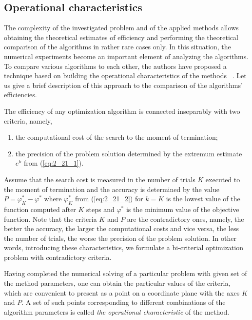 \subsection {Operational characteristics}
\label{subsec:2_2_3}
The complexity of the investigated problem and of the applied methods allows obtaining the theoretical estimates of efficiency and performing the theoretical comparison of the algorithms in rather rare cases only. In this situation, the numerical experiments become an important element of analyzing the algorithms. To compare various algorithms to each other, the authors have proposed a technique based on building the operational characteristics of the methods ~\cite{2_GrishaginOperChar, 2_StrSergMon2000}. Let us give a brief description of this approach to the comparison of the algorithms’ efficiencies.

The efficiency of any optimization algorithm is connected inseparably with two criteria, namely,

\begin{enumerate}
\item {the computational cost of the search to the moment of termination;}
\item {the precision of the problem solution determined by the extremum estimate $e^k$  from (\ref{eq:2_21_1})}. 
\end{enumerate}

Assume that the search cost is measured in the number of trials $K$ executed to the moment of termination and the accuracy is determined by the value $P=\varphi_K^*-\varphi^*$   where $\varphi_K^*$  from (\ref{eq:2_21_2}) for $k=K$ is the lowest value of the function computed after $K$ steps and  $\varphi^*$ is the minimum value of the objective function. Note that the criteria $K$ and $P$ are the contradictory ones, namely, the better the accuracy, the larger the computational costs and vice versa, the less the number of trials, the worse the precision of the problem solution. In other words, introducing these characteristics, we formulate a bi-criterial optimization problem with contradictory criteria.

Having completed the numerical solving of a particular problem with given set of the method parameters, one can obtain the particular values of the criteria, which are convenient to present as a point on a coordinate plane with the axes $K$ and  $P$. A set of such points corresponding to different combinations of the algorithm parameters is called \textit{the operational characteristic} of the method. 

